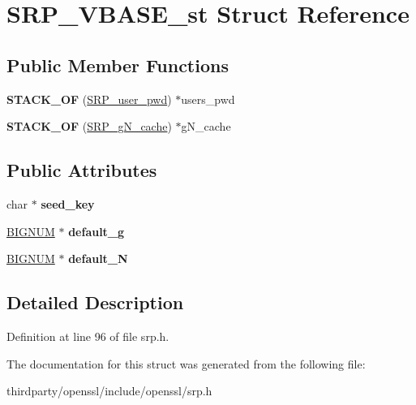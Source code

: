 \hypertarget{struct_s_r_p___v_b_a_s_e__st}{}\section{S\+R\+P\+\_\+\+V\+B\+A\+S\+E\+\_\+st Struct Reference}
\label{struct_s_r_p___v_b_a_s_e__st}
\subsection*{Public Member Functions}
\begin{DoxyCompactItemize}
\item 
\mbox{\label{struct_s_r_p___v_b_a_s_e__st_a0506f2c61ac61d332e87e7d689d336c0}} 
{\bfseries S\+T\+A\+C\+K\+\_\+\+OF} (\hyperlink{struct_s_r_p__user__pwd__st}{S\+R\+P\+\_\+user\+\_\+pwd}) $\ast$users\+\_\+pwd
\item 
\mbox{\label{struct_s_r_p___v_b_a_s_e__st_a650dca7916186013c1aa694f7290295b}} 
{\bfseries S\+T\+A\+C\+K\+\_\+\+OF} (\hyperlink{struct_s_r_p__g_n__cache__st}{S\+R\+P\+\_\+g\+N\+\_\+cache}) $\ast$g\+N\+\_\+cache
\end{DoxyCompactItemize}
\subsection*{Public Attributes}
\begin{DoxyCompactItemize}
\item 
\mbox{\label{struct_s_r_p___v_b_a_s_e__st_a9f8612fe073f8d7bc07c1177c3069a66}} 
char $\ast$ {\bfseries seed\+\_\+key}
\item 
\mbox{\label{struct_s_r_p___v_b_a_s_e__st_ad5245233a409421484ed56f3e6eba454}} 
\hyperlink{structbignum__st}{B\+I\+G\+N\+UM} $\ast$ {\bfseries default\+\_\+g}
\item 
\mbox{\label{struct_s_r_p___v_b_a_s_e__st_a5b98cadde5a5d7c0b32f5ce9596dca87}} 
\hyperlink{structbignum__st}{B\+I\+G\+N\+UM} $\ast$ {\bfseries default\+\_\+N}
\end{DoxyCompactItemize}


\subsection{Detailed Description}


Definition at line 96 of file srp.\+h.



The documentation for this struct was generated from the following file\+:\begin{DoxyCompactItemize}
\item 
thirdparty/openssl/include/openssl/srp.\+h\end{DoxyCompactItemize}
